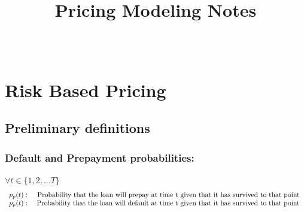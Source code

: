 \documentclass[12pt]{book}
\newenvironment{theorem}[2][Theorem]{\begin{trivlist}
\item[\hskip \labelsep {\bfseries #1}\hskip \labelsep {\bfseries #2.}]}{\end{trivlist}}
\begin{document}
 
 
\title{Pricing Modeling Notes}%
\author{\\ %
} %
 
\maketitle
 
 

\chapter{Risk Based Pricing}
\section{ Preliminary definitions} 
\subsection{Default and Prepayment probabilities:}
$ \forall t \in \{1,2,...T\}$
\[ %
\begin{array}{rr} %
   p_p(t)  :&  \mbox{
   Probability that the loan will prepay at time t given that it has survived to that point } \\
   p_p(t)  : &  \mbox{
   Probability that the loan will default at time t given that it has survived to that point
   }
\end{array} \noindent%
\] %
\end{document}

